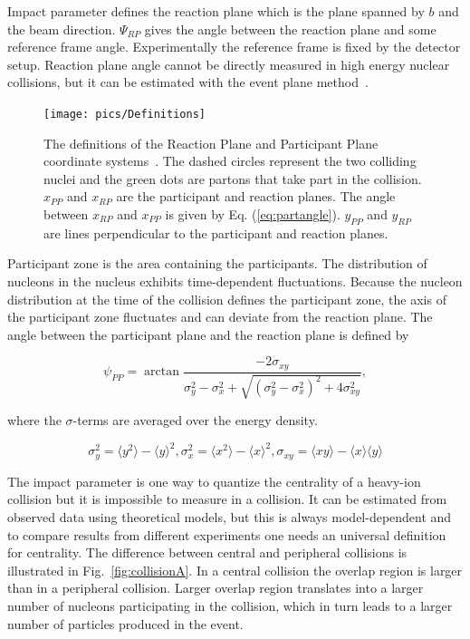 Impact parameter defines the reaction plane which is the plane spanned by $b$ and the beam direction. $\Psi_{RP}$ gives the angle between the reaction plane and some reference frame angle. Experimentally the reference frame is fixed by the detector setup. Reaction plane angle cannot be directly measured in high energy nuclear collisions, but it can be estimated with the event plane method~\cite{Voloshin:2008dg}. 
\begin{figure}[h!]
\centering
\texttt{[image: pics/Definitions]}
\caption[The definitions of the Reaction Plane and Participant Plane coordinate systems]{The definitions of the Reaction Plane and Participant Plane coordinate systems~\cite{Voloshin:2007pc}. The dashed circles represent the two colliding nuclei and the green dots are partons that take part  in the collision. $x_{PP}$ and $x_{RP}$ are the participant and reaction planes. The angle between $x_{RP}$ and $x_{PP}$ is given by Eq. (\ref{eq:partangle}). $y_{PP}$ and $y_{RP}$ are lines perpendicular to the participant and reaction planes. }
\label{fig:planes}
\end{figure}


Participant zone is the area containing the participants. The distribution of nucleons in the nucleus exhibits time-dependent fluctuations. Because the nucleon distribution at the time of the collision defines the participant zone, the axis of the participant zone fluctuates and can deviate from the reaction plane. The angle between the participant plane and the reaction plane is defined by ~\cite{Holopainen:2010gz}

\begin{equation}
\psi_{PP}=\arctan \frac{-2\sigma_{xy}}{\sigma_y^2-\sigma_x^2+\sqrt{\left(\sigma_y^2-\sigma_x^2\right)^2+4\sigma_{xy}^2}},
\label{eq:partangle}
\end{equation}

\noindent where the $\sigma$-terms are averaged over the energy density.

\begin{equation}
\sigma_y^2=\langle y^2\rangle-\langle y \rangle ^2, \sigma_x^2=\langle x^2\rangle-\langle x \rangle ^2, \sigma_{xy}=\langle xy \rangle - \langle x \rangle \langle y \rangle
\end{equation}

The impact parameter is one way to quantize the centrality of a heavy-ion collision but it is impossible to measure in a collision. It can be estimated from observed data using theoretical models, but this is always model-dependent and to compare results from different experiments one needs an universal definition for centrality. The difference between central and peripheral collisions is illustrated in Fig.~\ref{fig:collisionA}. In a central collision the overlap region is larger than in a peripheral collision. Larger overlap region translates into a larger number of nucleons participating in the collision, which in turn leads to a larger number of particles produced in the event.


